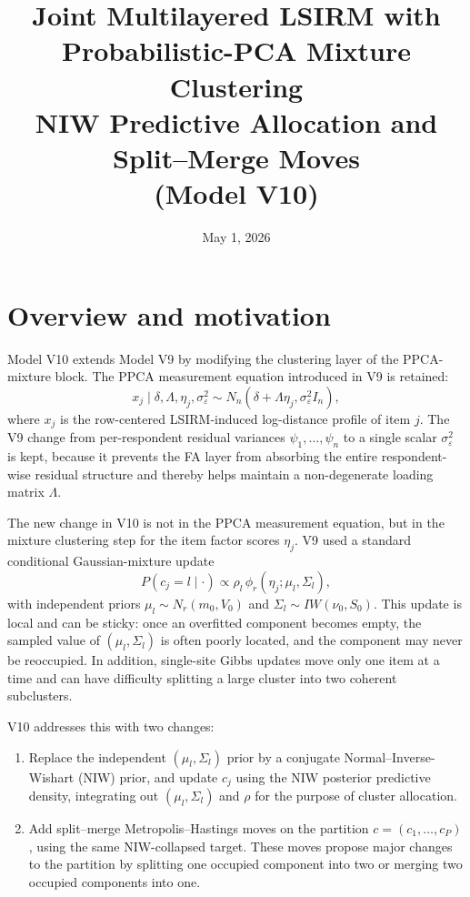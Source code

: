 \documentclass[11pt]{article}
\title{Joint Multilayered LSIRM with Probabilistic-PCA Mixture Clustering\\
NIW Predictive Allocation and Split--Merge Moves\\
(Model V10)}
\date{May 1, 2026}
\begin{document}
\maketitle

\section{Overview and motivation}

Model V10 extends Model V9 by modifying the clustering layer of the
PPCA-mixture block.  The PPCA measurement equation introduced in V9 is
retained:
\[
    x_j \mid \delta,\Lambda,\eta_j,\sigma_\varepsilon^2
    \sim N_n(\delta+\Lambda\eta_j,\sigma_\varepsilon^2 I_n),
\]
where $x_j$ is the row-centered LSIRM-induced log-distance profile of item
$j$.  The V9 change from per-respondent residual variances
$\psi_1,\dots,\psi_n$ to a single scalar $\sigma_\varepsilon^2$ is kept,
because it prevents the FA layer from absorbing the entire respondent-wise
residual structure and thereby helps maintain a non-degenerate loading
matrix $\Lambda$.

The new change in V10 is not in the PPCA measurement equation, but in the
mixture clustering step for the item factor scores $\eta_j$.  V9 used a
standard conditional Gaussian-mixture update
\[
    P(c_j=l\mid\cdot)\propto \rho_l\,\phi_r(\eta_j;\mu_l,\Sigma_l),
\]
with independent priors $\mu_l\sim N_r(m_0,V_0)$ and
$\Sigma_l\sim IW(\nu_0,S_0)$.  This update is local and can be sticky: once
an overfitted component becomes empty, the sampled value of
$(\mu_l,\Sigma_l)$ is often poorly located, and the component may never be
reoccupied.  In addition, single-site Gibbs updates move only one item at a
time and can have difficulty splitting a large cluster into two coherent
subclusters.

V10 addresses this with two changes:
\begin{enumerate}[leftmargin=2em]
    \item Replace the independent $(\mu_l,\Sigma_l)$ prior by a conjugate
    Normal--Inverse-Wishart (NIW) prior, and update $c_j$ using the NIW
    posterior predictive density, integrating out $(\mu_l,\Sigma_l)$ and
    $\rho$ for the purpose of cluster allocation.
    \item Add split--merge Metropolis--Hastings moves on the partition
    $c=(c_1,\dots,c_P)$, using the same NIW-collapsed target.  These moves
    propose major changes to the partition by splitting one occupied
    component into two or merging two occupied components into one.
\end{enumerate}
\end{document}
